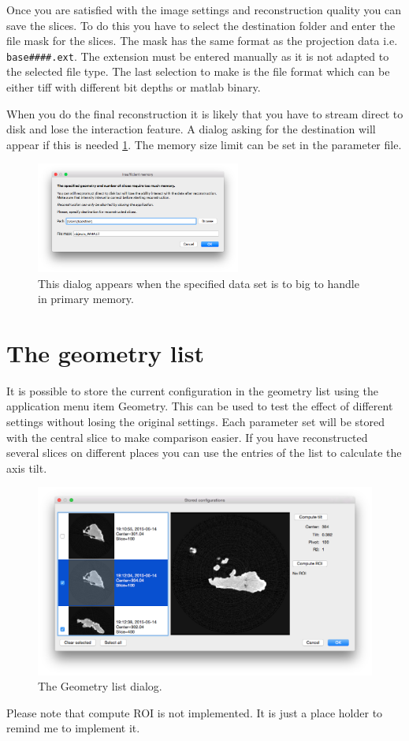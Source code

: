 \documentclass[a4paper]{scrreprt}
\begin{document}
Once you are satisfied with the image settings and reconstruction quality you can save the slices. To do this you have to select the destination folder and enter the file mask for the slices. The mask has the same format as the projection data i.e. \verb+base####.ext+. The extension must be entered manually as it is not adapted to the selected file type. The last selection to make is the file format which can be either tiff with different bit depths or matlab binary.

When you do the final reconstruction it is likely that you have to stream direct to disk and lose the interaction feature. A dialog asking for the destination will appear if this is needed \ref{fig_bigdata}. The memory size limit can be set in the parameter file. 
\begin{figure}
\centering
\includegraphics[width=0.6\textwidth]{figures3/Dialog_BigDataSet.png}
\caption{This dialog appears when the specified data set is to big to handle in primary memory.}\label{fig_bigdata}
\end{figure}

\section{The geometry list}
It is possible to store the current configuration in the geometry list using the application menu item Geometry. This can be used to test the effect of different settings without losing the original settings. Each parameter set will be stored with the central slice to make comparison easier. If you have reconstructed several slices on different places you can use the entries of the list to calculate the axis tilt. 
\begin{figure}[ht!]
\centering
\includegraphics[scale=0.4]{figures3/GeometryListDlg.png}
\caption{The Geometry list dialog.}
\end{figure}
Please note that compute ROI is not implemented. It is just a place holder to remind me to implement it.
\end{document}

